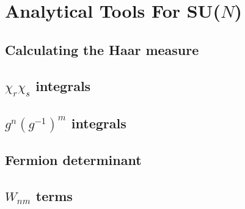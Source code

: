 \chapter{Analytical Tools For SU(\texorpdfstring{$N$}{N})}

\section{Calculating the Haar measure} \label{sec:haar_measure}
\section{\texorpdfstring{$\chi_r \chi_s$}{Ln Lm} integrals} \label{sec:character_integrals}
\section{\texorpdfstring{$g^n (g^{-1})^m$}{Un Udm} integrals} \label{sec:sun_integrals}
\section{Fermion determinant}
\section{\texorpdfstring{$W_{nm}$}{Wnm} terms}
